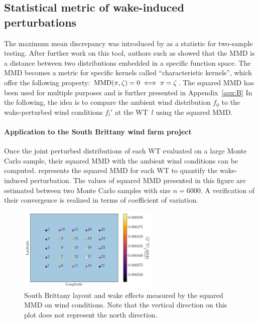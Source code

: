 \subsection{Statistical metric of wake-induced perturbations}\label{sec:metric}


The maximum mean discrepancy was introduced by \cite{gretton_2006} as a statistic for two-sample testing. 
After further work on this tool, authors such as \cite{sriperumbudur_2010} showed that the MMD is a distance between two distributions embedded in a specific function space. 
The MMD becomes a metric for specific kernels called “characteristic kernels”, which offer the following property: $\mathrm{MMD}(\pi, \zeta)=0 \iff \pi = \zeta$. 
The squared MMD has been used for multiple purposes and is further presented in Appendix~\ref{apx:B}
In the following, the idea is to compare the ambient wind distribution $f_0$ to the wake-perturbed wind conditions $f_l'$ at the WT~$l$ using the squared MMD.

\paragraph{Application to the South Brittany wind farm project}
Once the joint perturbed distributions of each WT evaluated on a large Monte Carlo sample, their squared MMD with the ambient wind conditions can be computed. 
 represents the squared MMD for each WT to quantify the wake-induced perturbation. 
The values of squared MMD presented in this figure are estimated between two Monte Carlo samples with size $n=6000$. 
A verification of their convergence is realized in terms of coefficient of variation. 

\begin{figure}
    \centering
    \includegraphics[width=0.6\textwidth]{part2/figures/WAKE/wake_perturbation_SB.png}
    \caption{South Brittany layout and wake effects measured by the squared MMD on wind conditions. 
    Note that the vertical direction on this plot does not represent the north direction.}
    \label{fig:FIGWakeEffect}
\end{figure}

